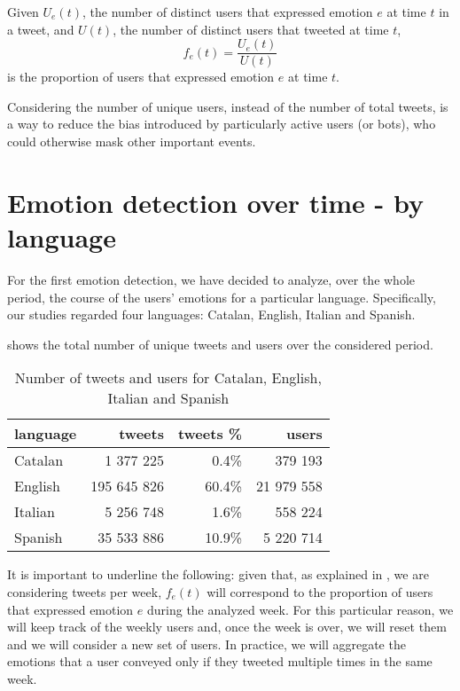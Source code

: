 \begin{definition}
\label{def:user-emotions}
	Given \(U_e(t)\), the number of distinct users that expressed emotion \(e\) at time \(t\) in a tweet, and \(U(t)\), the number of distinct users that tweeted at time \(t\),
	\[f_e(t) = \frac{U_e(t)}{U(t)}\]
	is the proportion of users that expressed emotion \(e\) at time \(t\).	
\end{definition}

Considering the number of unique users, instead of the number of total tweets, is a way to reduce the bias introduced by particularly active users (or bots), who could otherwise mask other important events.

\section{Emotion detection over time - by language}
\label{sec:emotion-by-language}

For the first emotion detection, we have decided to analyze, over the whole period, the course of the users' emotions for a particular language. Specifically, our studies regarded four languages: Catalan, English, Italian and Spanish.

 shows the total number of unique tweets and users over the considered period.

\begin{table}[h]
	\centering
	\begin{tabular}{lrrr}
		\toprule
		\textbf{language} & \textbf{tweets} & \textbf{tweets \%} & \textbf{users}
		\\
		\midrule
		Catalan & 1 377 225 & 0.4\% & 379 193
		\\
		English & 195 645 826 & 60.4\% & 21 979 558 
		\\
		Italian & 5 256 748 & 1.6\% & 558 224
		\\
		Spanish & 35 533 886 & 10.9\% & 5 220 714
		\\
		\bottomrule
	\end{tabular}
	\caption{Number of tweets and users for Catalan, English, Italian and Spanish}
	\label{tab:tweet-languages}
\end{table}

It is important to underline the following: given that, as explained in , we are considering tweets per week, \(f_e(t)\) will correspond to the proportion of users that expressed emotion \(e\) during the analyzed week. For this particular reason, we will keep track of the weekly users and, once the week is over, we will reset them and we will consider a new set of users. In practice, we will aggregate the emotions that a user conveyed only if they tweeted multiple times in the same week. 

